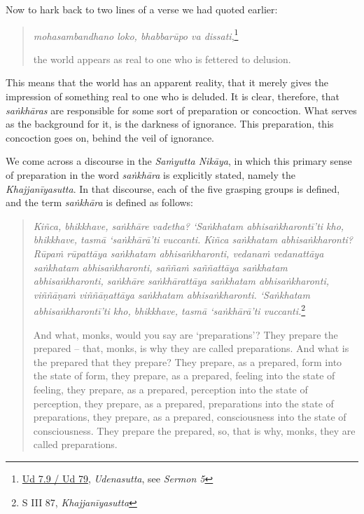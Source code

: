 Now to hark back to two lines of a verse we had quoted earlier:

\begin{quote}
\emph{mohasambandhano loko, bhabbarūpo va dissati},\footnote{\href{https://suttacentral.net/ud7.9/pli/ms}{Ud 7.9 / Ud 79}, \emph{Udenasutta}, see \emph{Sermon 5}}

the world appears as real to one who is fettered to delusion.
\end{quote}

This means that the world has an apparent reality, that it merely gives the impression of something real to one who is deluded. It is clear, therefore, that \emph{saṅkhāras} are responsible for some sort of preparation or concoction. What serves as the background for it, is the darkness of ignorance. This preparation, this concoction goes on, behind the veil of ignorance.

We come across a discourse in the \emph{Saṁyutta Nikāya}, in which this primary sense of preparation in the word \emph{saṅkhāra} is explicitly stated, namely the \emph{Khajjanīyasutta}. In that discourse, each of the five grasping groups is defined, and the term \emph{saṅkhāra} is defined as follows:

\clearpage

\begin{quote}
\emph{Kiñca, bhikkhave, saṅkhāre vadetha? `Saṅkhatam abhisaṅkharontī'ti kho, bhikkhave, tasmā `saṅkhārā'ti vuccanti. Kiñca saṅkhatam abhisaṅkharonti? Rūpaṁ rūpattāya saṅkhatam abhisaṅkharonti, vedanaṁ vedanattāya saṅkhatam abhisaṅkharonti, saññaṁ saññattāya saṅkhatam abhisaṅkharonti, saṅkhāre saṅkhārattāya saṅkhatam abhisaṅkharonti, viññāṇaṁ viññāṇattāya saṅkhatam abhisaṅkharonti. `Saṅkhatam abhisaṅkharontī'ti kho, bhikkhave, tasmā `saṅkhārā'ti vuccanti.}\footnote{S III 87, \emph{Khajjanīyasutta}}

And what, monks, would you say are `preparations'? They prepare the prepared -- that, monks, is why they are called preparations. And what is the prepared that they prepare? They prepare, as a prepared, form into the state of form, they prepare, as a prepared, feeling into the state of feeling, they prepare, as a prepared, perception into the state of perception, they prepare, as a prepared, preparations into the state of preparations, they prepare, as a prepared, consciousness into the state of consciousness. They prepare the prepared, so, that is why, monks, they are called preparations.
\end{quote}

